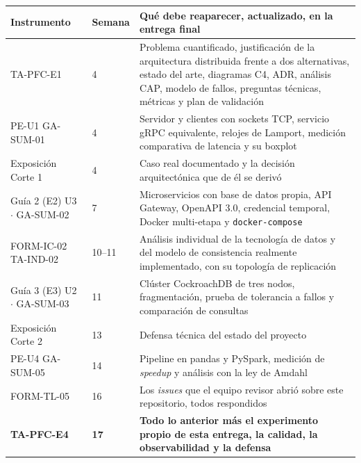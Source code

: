 \documentclass[11pt,a4paper]{article}
\begin{document}
	\begin{center}
		\footnotesize
		\begin{longtable}{@{}p{2.5cm}p{1.5cm}p{11.2cm}@{}}
			\toprule
			\textbf{Instrumento} & \textbf{Semana} & \textbf{Qué debe reaparecer, actualizado, en la entrega final} \\
			\midrule
			\endhead
			TA-PFC-E1 & 4 & Problema cuantificado, justificación de la arquitectura distribuida frente a dos alternativas, estado del arte, diagramas C4, ADR, análisis CAP, modelo de fallos, preguntas técnicas, métricas y plan de validación \\
			\addlinespace
			PE-U1 \newline GA-SUM-01 & 4 & Servidor y clientes con sockets TCP, servicio gRPC equivalente, relojes de Lamport, medición comparativa de latencia y su boxplot \\
			\addlinespace
			Exposición \newline Corte 1 & 4 & Caso real documentado y la decisión arquitectónica que de él se derivó \\
			\addlinespace
			Guía 2 (E2) \newline U3 $\cdot$ GA-SUM-02 & 7 & Microservicios con base de datos propia, API Gateway, OpenAPI 3.0, credencial temporal, Docker multi-etapa y \texttt{docker-compose} \\
			\addlinespace
			FORM-IC-02 \newline TA-IND-02 & 10--11 & Análisis individual de la tecnología de datos y del modelo de consistencia realmente implementado, con su topología de replicación \\
			\addlinespace
			Guía 3 (E3) \newline U2 $\cdot$ GA-SUM-03 & 11 & Clúster CockroachDB de tres nodos, fragmentación, prueba de tolerancia a fallos y comparación de consultas \\
			\addlinespace
			Exposición \newline Corte 2 & 13 & Defensa técnica del estado del proyecto \\
			\addlinespace
			PE-U4 \newline GA-SUM-05 & 14 & Pipeline en pandas y PySpark, medición de \emph{speedup} y análisis con la ley de Amdahl \\
			\addlinespace
			FORM-TL-05 & 16 & Los \emph{issues} que el equipo revisor abrió sobre este repositorio, todos respondidos \\
			\addlinespace
			\textbf{TA-PFC-E4} & \textbf{17} & \textbf{Todo lo anterior más el experimento propio de esta entrega, la calidad, la observabilidad y la defensa} \\
			\bottomrule
		\end{longtable}
	\end{center}
	
\end{document}
